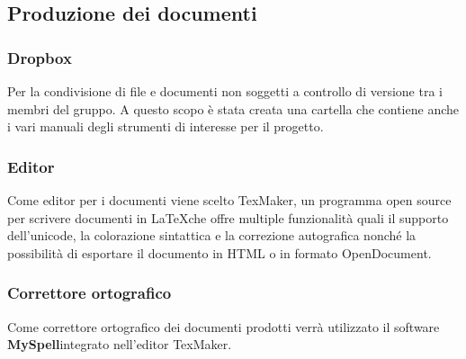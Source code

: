 \documentclass[a4paper,11pt]{article}
\begin{document}
	\subsection{Produzione dei documenti}
	
	\subsubsection{Dropbox}
	Per la condivisione di file e documenti non soggetti a controllo di versione tra i membri del gruppo. A questo scopo è stata creata una cartella che contiene anche i vari  manuali degli strumenti di interesse per il progetto.
	\subsubsection{Editor}
	Come editor per i documenti viene scelto TexMaker\addglos, un programma open source per scrivere documenti in \LaTeX   che offre multiple funzionalità quali il supporto dell'unicode, la colorazione sintattica e la correzione autografica nonché la possibilità di esportare il documento in HTML o in formato OpenDocument\addglos.
	\subsubsection{Correttore ortografico}
	Come correttore ortografico dei documenti prodotti verrà utilizzato il software \textbf{MySpell}\addglos integrato nell'editor TexMaker.
	\newpage
	
		
	
\end{document}
